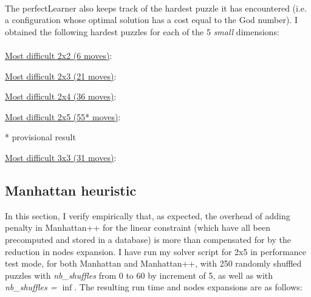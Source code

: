 \\
The perfectLearner also keeps track of the hardest puzzle it has encountered (i.e. a configuration whose optimal solution has a cost equal to the God number). I obtained the following hardest puzzles for each of the 5 \textit{small} dimensions:
\\
\\
\underline{Most difficult 2x2 (6 moves)}:
\begin{center}
\begin{three}
\end{three}
\end{center}
\underline{Most difficult 2x3 (21 moves)}:
\begin{center}
\begin{five}
\end{five}
\end{center}
\underline{Most difficult 2x4 (36 moves)}:
\begin{center}
\begin{seven}
\end{seven}
\end{center}
\underline{Most difficult 2x5 (55* moves)}:
\begin{center}
\begin{nine}
\tiny{* provisional result}
\end{nine}
\end{center}
\underline{Most difficult 3x3 (31 moves)}:
\begin{center}
\begin{eight}
\end{eight}
\end{center}




\subsection{Manhattan heuristic}
\label{MHComp}
In this section, I verify empirically that, as expected, the overhead of adding penalty in Manhattan++ for the linear constraint (which have all been precomputed and stored in a database) is more than compensated for by the reduction in nodes expansion. I have run my solver script for 2x5 in performance test mode, for both Manhattan and Manhattan++, with 250 randomly shuffled puzzles with \textit{nb\_shuffles} from 0 to 60 by increment of 5, as well as with \textit{nb\_shuffles = $\inf$}. The resulting run time and nodes expansions are as follows:

